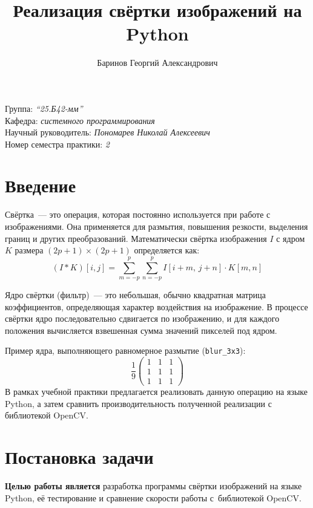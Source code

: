 \documentclass[a4paper]{article}
\title{Реализация свёртки изображений на Python}
\author{Баринов Георгий Александрович}
\date{}
\begin{document}
\maketitle
\begin{flushright}
    Группа: \emph{\enquote{25.Б42-мм}} \\
    Кафедра: \emph{системного программирования} \\
    Научный руководитель: \emph{Пономарев Николай Алексеевич} \\
    Номер семестра практики: \emph{2}
\end{flushright}

\section{Введение}

Свёртка~--- это операция, которая постоянно используется при работе с изображениями. Она применяется для размытия, повышения резкости, выделения границ и других преобразований. Математически свёртка изображения $I$ с ядром $K$ размера $(2p+1) \times (2p+1)$ определяется как:
\[
(I * K)[i, j] = \sum_{m=-p}^{p} \sum_{n=-p}^{p} I[i+m,\, j+n] \cdot K[m, n]
\]

Ядро свёртки (фильтр)~--- это небольшая, обычно квадратная матрица коэффициентов, определяющая характер воздействия на изображение. В процессе свёртки ядро последовательно сдвигается по изображению, и для каждого положения вычисляется взвешенная сумма значений пикселей под ядром.

Пример ядра, выполняющего равномерное размытие (\texttt{blur\_3x3}):
\[
\frac{1}{9} \begin{pmatrix}
1 & 1 & 1 \\
1 & 1 & 1 \\
1 & 1 & 1
\end{pmatrix}
\]
В рамках учебной практики предлагается реализовать данную операцию на языке Python, а затем сравнить производительность полученной реализации с библиотекой OpenCV.

\section{Постановка задачи}

\textbf{Целью работы является} разработка программы свёртки изображений на языке Python, её тестирование и сравнение скорости работы с~библиотекой OpenCV.
\end{document}
